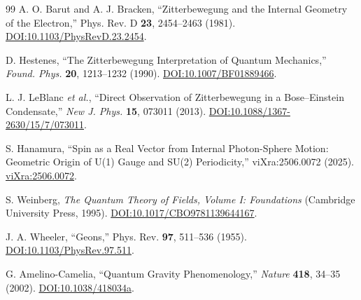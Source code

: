 \documentclass[%
 reprint,
 amsmath,amssymb,
 aps,
]{revtex4-1}
\numberwithin{equation}{section}%
\begin{document}
\begin{thebibliography}{99}
A. O. Barut and A. J. Bracken, ``Zitterbewegung and the Internal Geometry of the Electron,'' Phys. Rev. D \textbf{23}, 2454--2463 (1981). \href{https://doi.org/10.1103/PhysRevD.23.2454}{DOI:10.1103/PhysRevD.23.2454}.

D. Hestenes, ``The Zitterbewegung Interpretation of Quantum Mechanics,'' \textit{Found. Phys.} \textbf{20}, 1213--1232 (1990). \href{https://doi.org/10.1007/BF01889466}{DOI:10.1007/BF01889466}.

L. J. LeBlanc \textit{et al.}, ``Direct Observation of Zitterbewegung in a Bose--Einstein Condensate,'' \textit{New J. Phys.} \textbf{15}, 073011 (2013). \href{https://doi.org/10.1088/1367-2630/15/7/073011}{DOI:10.1088/1367-2630/15/7/073011}.

S. Hanamura, ``Spin as a Real Vector from Internal Photon-Sphere Motion: Geometric Origin of U(1) Gauge and SU(2) Periodicity,'' viXra:2506.0072 (2025). \href{https://vixra.org/abs/2506.0072}{viXra:2506.0072}.

S. Weinberg, \textit{The Quantum Theory of Fields, Volume I: Foundations} (Cambridge University Press, 1995). \href{https://doi.org/10.1017/CBO9781139644167}{DOI:10.1017/CBO9781139644167}.

J. A. Wheeler, ``Geons,'' Phys. Rev. \textbf{97}, 511--536 (1955). \href{https://doi.org/10.1103/PhysRev.97.511}{DOI:10.1103/PhysRev.97.511}.

G. Amelino-Camelia, ``Quantum Gravity Phenomenology,'' \textit{Nature} \textbf{418}, 34--35 (2002). \href{https://doi.org/10.1038/418034a}{DOI:10.1038/418034a}.

\end{thebibliography}

\end{document}
